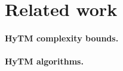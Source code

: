 \section{Related work}
\label{sec:related}
%
\paragraph{HyTM complexity bounds.}

\paragraph{HyTM algorithms.} 